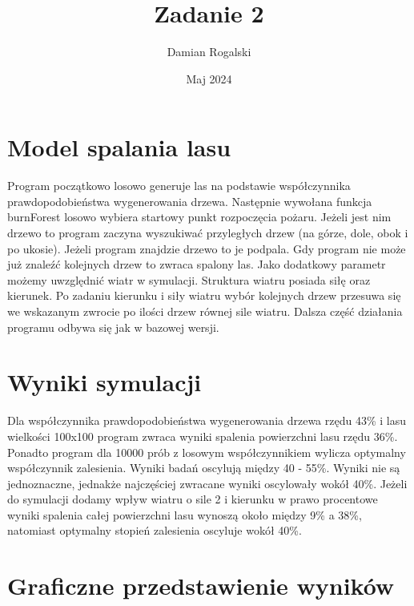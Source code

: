 \documentclass{article}
\title{Zadanie 2}
\author{Damian Rogalski}
\date{Maj 2024}
\begin{document}
\maketitle

\section{Model spalania lasu}
Program początkowo losowo generuje las na podstawie współczynnika prawdopodobieństwa wygenerowania drzewa. Następnie wywołana funkcja burnForest losowo wybiera startowy punkt rozpoczęcia pożaru. Jeżeli jest nim drzewo to program zaczyna wyszukiwać przyległych drzew (na górze, dole, obok i po ukosie). Jeżeli program znajdzie drzewo to je podpala. Gdy program nie może już znaleźć kolejnych drzew to zwraca spalony las. Jako dodatkowy parametr możemy uwzględnić wiatr w symulacji. Struktura wiatru posiada siłę oraz kierunek. Po zadaniu kierunku i siły wiatru wybór kolejnych drzew przesuwa się we wskazanym zwrocie po ilości drzew równej sile wiatru. Dalsza część działania programu odbywa się jak w bazowej wersji. 

\section{Wyniki symulacji}
Dla współczynnika prawdopodobieństwa wygenerowania drzewa rzędu 43\% i lasu wielkości 100x100 program zwraca wyniki spalenia powierzchni lasu rzędu 36\%. Ponadto program dla 10000 prób z losowym współczynnikiem wylicza optymalny współczynnik zalesienia. Wyniki badań oscylują między 40 - 55\%. Wyniki nie są jednoznaczne, jednakże najczęściej zwracane wyniki oscylowały wokół 40\%. Jeżeli do symulacji dodamy wpływ wiatru o sile 2 i kierunku w prawo procentowe wyniki spalenia całej powierzchni lasu wynoszą około między 9\% a 38\%, natomiast optymalny stopień zalesienia oscyluje wokół 40\%. 

\newpage

\section{Graficzne przedstawienie wyników}
\end{document}
